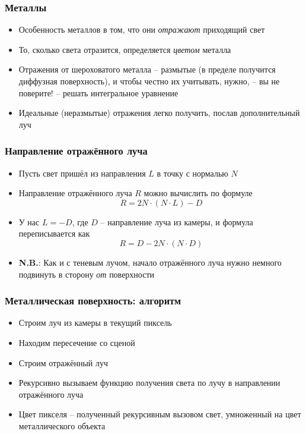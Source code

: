 \documentclass[10pt]{beamer}
\begin{document}
\begin{frame}[fragile]
\frametitle{Металлы}
\begin{itemize}
\item Особенность металлов в том, что они \textit{отражают} приходящий свет
\pause
\item То, сколько света отразится, определяется \textit{цветом} металла
\pause
\item Отражения от шероховатого металла -- размытые (в пределе получится диффузная поверхность), и чтобы честно их учитывать, нужно, -- вы не поверите! -- решать интегральное уравнение
\pause
\item Идеальные (неразмытые) отражения легко получить, послав дополнительный луч
\end{itemize}
\end{frame}

\begin{frame}[fragile]
\frametitle{Направление отражённого луча}
\begin{itemize}
\item Пусть свет пришёл из направления \begin{math}L\end{math} в точку с нормалью \begin{math}N\end{math}
\pause
\item Направление отражённого луча \begin{math}R\end{math} можно вычислить по формуле 
\begin{equation*}
R = 2N\cdot(N \cdot L) - D
\end{equation*}
\pause
\item У нас \begin{math}L=-D\end{math}, где \begin{math}D\end{math} -- направление луча из камеры, и формула переписывается как
\begin{equation*}
R = D - 2N\cdot(N \cdot D)
\end{equation*}
\pause
\item \alert{\textbf{N.B.}}: Как и с теневым лучом, начало отражённого луча нужно немного подвинуть в сторону \textit{от} поверхности
\end{itemize}
\end{frame}

\begin{frame}[fragile]
\frametitle{Металлическая поверхность: алгоритм}
\begin{itemize}
\item Строим луч из камеры в текущий пиксель
\pause
\item Находим пересечение со сценой
\pause
\item Строим отражённый луч
\pause
\item Рекурсивно вызываем функцию получения света по лучу в направлении отражённого луча
\pause
\item Цвет пикселя -- полученный рекурсивным вызовом свет, умноженный на цвет металлического объекта
\end{itemize}
\end{frame}
\end{document}
